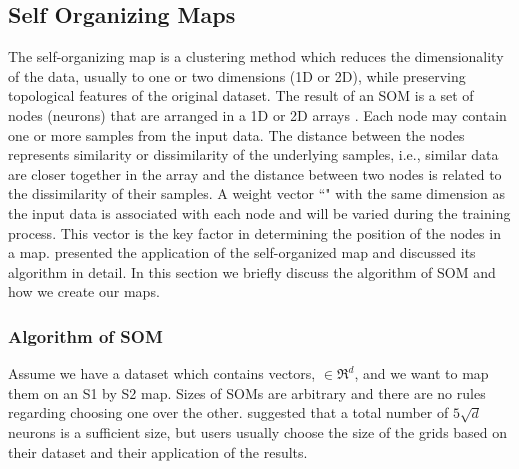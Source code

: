 
 \subsection{Self Organizing Maps}
 \label{sec: som}
 
 The self-organizing map is a clustering method which reduces the dimensionality of the data, usually to one or two dimensions (1D or 2D), while preserving topological features of the original dataset.
 The result of an SOM is a set of nodes (neurons) that are arranged in a 1D or 2D arrays \citep{Kohonen98}. 
 Each node may contain one or more samples from the input data.
 The distance between the nodes represents similarity or dissimilarity of the underlying samples, i.e., similar data are closer together in the array and the distance between two nodes is related to the dissimilarity of their samples.
 A weight vector ``" with the same dimension as the input data is associated with each node and will be varied during the training process.
 This vector is the key factor in determining the position of the nodes in a map.
 \cite{Geach12} presented the application of the self-organized map and discussed its algorithm in detail.
 In this section we briefly discuss the algorithm of SOM and how we create our maps. 
 
 \subsubsection{Algorithm of SOM} 
 \label{sec: algorithm}
     Assume we have a dataset which contains vectors,  $\in \Re^d$, and we want to map them on an S1 by S2 map. 
     Sizes of SOMs are arbitrary and there are no rules regarding choosing one over the other. 
    \citet{Vesanto05} suggested that a total number of $5\sqrt{d}$ neurons is a sufficient size, but users usually choose the size of the grids based on their dataset and their application of the results.

